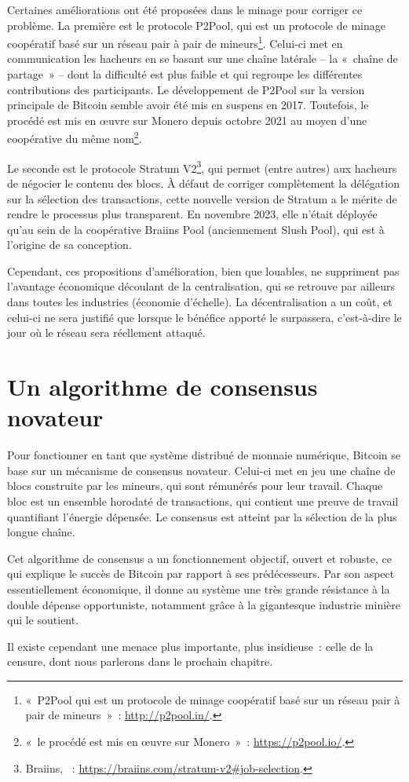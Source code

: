 Certaines améliorations ont été proposées dans le minage pour corriger ce problème. La première est le protocole P2Pool, qui est un protocole de minage coopératif basé sur un réseau pair à pair de mineurs\footnote{«~P2Pool qui est un protocole de minage coopératif basé sur un réseau pair à pair de mineurs~»~: \url{http://p2pool.in/}.}. Celui-ci met en communication les hacheurs en se basant sur une chaîne latérale -- la «~chaîne de partage~» -- dont la difficulté est plus faible et qui regroupe les différentes contributions des participants. Le développement de P2Pool sur la version principale de Bitcoin semble avoir été mis en suspens en 2017. Toutefois, le procédé est mis en œuvre sur Monero depuis octobre 2021 au moyen d'une coopérative du même nom\footnote{«~le procédé est mis en œuvre sur Monero~»~: \url{https://p2pool.io/}.}.

Le seconde est le protocole Stratum V2\footnote{Braiins, ~: \url{https://braiins.com/stratum-v2\#job-selection}.}, qui permet (entre autres) aux hacheurs de négocier le contenu des blocs. À défaut de corriger complètement la délégation sur la sélection des transactions, cette nouvelle version de Stratum a le mérite de rendre le processus plus transparent. En novembre 2023, elle n'était déployée qu'au sein de la coopérative Braiins Pool (anciennement Slush Pool), qui est à l'origine de sa conception.

Cependant, ces propositions d'amélioration, bien que louables, ne suppriment pas l'avantage économique découlant de la centralisation, qui se retrouve par ailleurs dans toutes les industries (économie d'échelle). La décentralisation a un coût, et celui-ci ne sera justifié que lorsque le bénéfice apporté le surpassera, c'est-à-dire le jour où le réseau sera réellement attaqué.

\section*{Un algorithme de consensus novateur}

Pour fonctionner en tant que système distribué de monnaie numérique, Bitcoin se base sur un mécanisme de consensus novateur. Celui-ci met en jeu une chaîne de blocs construite par les mineurs, qui sont rémunérés pour leur travail. Chaque bloc est un ensemble horodaté de transactions, qui contient une preuve de travail quantifiant l'énergie dépensée. Le consensus est atteint par la sélection de la plus longue chaîne.

Cet algorithme de consensus a un fonctionnement objectif, ouvert et robuste, ce qui explique le succès de Bitcoin par rapport à ses prédécesseurs. Par son aspect essentiellement économique, il donne au système une très grande résistance à la double dépense opportuniste, notamment grâce à la gigantesque industrie minière qui le soutient.

Il existe cependant une menace plus importante, plus insidieuse~: celle de la censure, dont nous parlerons dans le prochain chapitre.